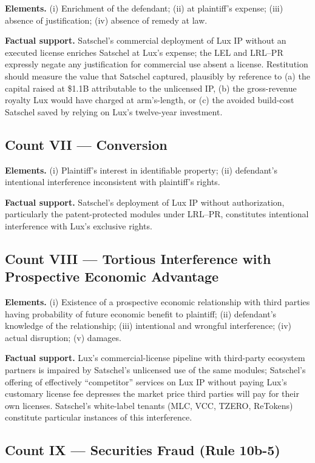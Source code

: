 \documentclass[11pt,letterpaper]{article}
\begin{document}
\textbf{Elements.} (i) Enrichment of the defendant; (ii) at plaintiff's
expense; (iii) absence of justification; (iv) absence of remedy at law.

\textbf{Factual support.} Satschel's commercial deployment of Lux IP
without an executed license enriches Satschel at Lux's expense; the
LEL and LRL--PR expressly negate any justification for commercial use
absent a license. Restitution should measure the value that Satschel
captured, plausibly by reference to (a) the capital raised at \$1.1B
attributable to the unlicensed IP, (b) the gross-revenue royalty Lux
would have charged at arm's-length, or (c) the avoided build-cost
Satschel saved by relying on Lux's twelve-year investment.

\subsection*{Count VII --- Conversion}

\textbf{Elements.} (i) Plaintiff's interest in identifiable property;
(ii) defendant's intentional interference inconsistent with plaintiff's
rights.

\textbf{Factual support.} Satschel's deployment of Lux IP without
authorization, particularly the patent-protected modules under LRL--PR,
constitutes intentional interference with Lux's exclusive rights.

\subsection*{Count VIII --- Tortious Interference with Prospective
Economic Advantage}

\textbf{Elements.} (i) Existence of a prospective economic relationship
with third parties having probability of future economic benefit to
plaintiff; (ii) defendant's knowledge of the relationship; (iii)
intentional and wrongful interference; (iv) actual disruption; (v)
damages.

\textbf{Factual support.} Lux's commercial-license pipeline with
third-party ecosystem partners is impaired by Satschel's unlicensed
use of the same modules; Satschel's offering of effectively
``competitor'' services on Lux IP without paying Lux's customary
license fee depresses the market price third parties will pay for
their own licenses. Satschel's white-label tenants (MLC, VCC, TZERO,
ReTokens) constitute particular instances of this interference.

\subsection*{Count IX --- Securities Fraud (Rule 10b-5)}
\end{document}
